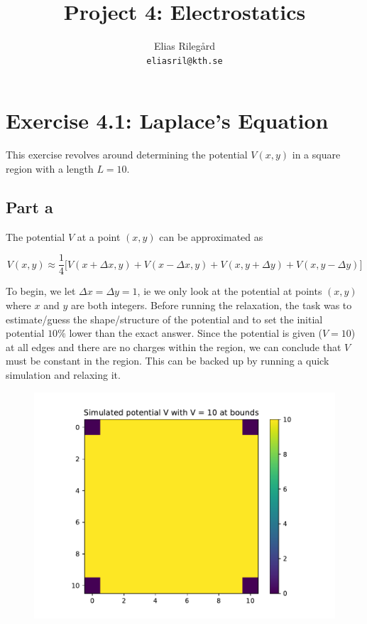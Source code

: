 \documentclass[a4paper,12pt]{article}
\title{Project 4: Electrostatics}
\author{
  Elias Rilegård\\
  \texttt{eliasril@kth.se}
}
\begin{document}
\maketitle

\section*{Exercise 4.1: Laplace's Equation}

This exercise revolves around determining the potential $V(x,y)$ in a square region with a length $L = 10$.

\subsection*{Part a}

The potential $V$ at a point $(x, y)$ can be approximated as

\begin{equation*}
  V(x, y) \approx \frac{1}{4} \biggl[ V(x + \Delta x, y) + V(x - \Delta x, y) + V(x, y + \Delta y) + V(x, y - \Delta y) \biggr]
\end{equation*}

To begin, we let $\Delta x = \Delta y = 1$, ie we only look at the potential at points $(x,y)$ where $x$ and $y$ are
both integers. Before running the relaxation, the task was to estimate/guess the shape/structure of the potential and
to set the initial potential $10 \%$ lower than the exact answer. Since the potential is given ($V = 10$) at all edges
and there are no charges within the region, we can conclude that $V$ must be constant in the region. This can be
backed up by running a quick simulation and relaxing it. 

\begin{figure}[!ht]
  \centering
  \includegraphics[scale=0.49]{img/4_1a_simulated_V.pdf}
\end{figure}
\end{document}
